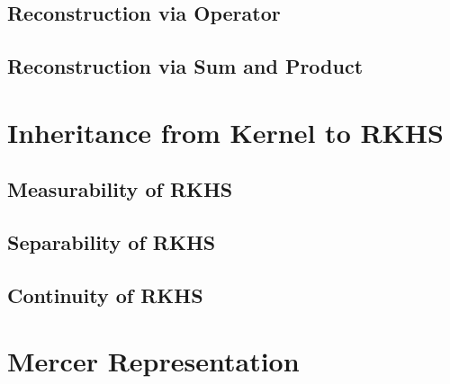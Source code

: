 \documentclass[a4paper,12pt]{article}
\theoremstyle{remark}
\theoremstyle{definition}
\theoremstyle{definition}
\theoremstyle{definition}
\begin{document}
\subsection{Reconstruction via Operator}
\subsection{Reconstruction via Sum and Product}

\section{Inheritance from Kernel to RKHS}
\subsection{Measurability of RKHS}
\subsection{Separability of RKHS}
\subsection{Continuity of RKHS}

\section{Mercer Representation}


\end{document}
